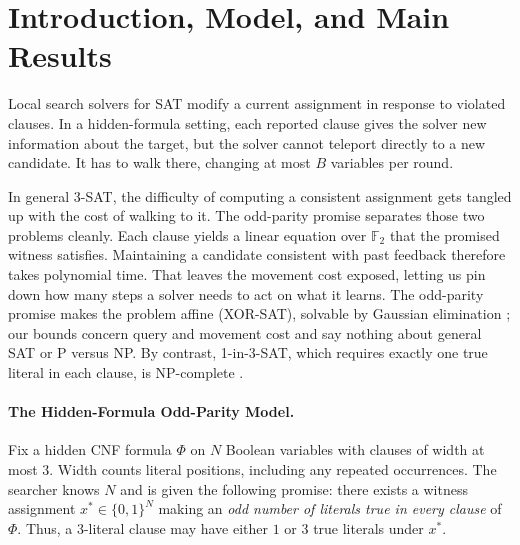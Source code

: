 \documentclass[11pt,a4paper]{article}
\theoremstyle{definition}
\theoremstyle{remark}
\newcommand{\F}{\mathbb{F}}
\begin{document}
\section{Introduction, Model, and Main Results}

Local search solvers for SAT modify a current assignment in response to violated clauses. In a hidden-formula setting, each reported clause gives the solver new information about the target, but the solver cannot teleport directly to a new candidate. It has to walk there, changing at most $B$ variables per round.

In general 3-SAT, the difficulty of computing a consistent assignment gets tangled up with the cost of walking to it. The odd-parity promise separates those two problems cleanly. Each clause yields a linear equation over $\F_2$ that the promised witness satisfies. Maintaining a candidate consistent with past feedback therefore takes polynomial time. That leaves the movement cost exposed, letting us pin down how many steps a solver needs to act on what it learns. The odd-parity promise makes the problem affine (XOR-SAT), solvable by Gaussian elimination \cite{schaefer1978}; our bounds concern query and movement cost and say nothing about general SAT or P versus NP. By contrast, 1-in-3-SAT, which requires exactly one true literal in each clause, is NP-complete \cite{schaefer1978}.

\paragraph{The Hidden-Formula Odd-Parity Model.}
Fix a hidden CNF formula $\Phi$ on $N$ Boolean variables with clauses of width at most $3$. Width counts literal positions, including any repeated occurrences. The searcher knows $N$ and is given the following promise: there exists a witness assignment $x^* \in \{0,1\}^N$ making an \emph{odd number of literals true in every clause} of $\Phi$. Thus, a $3$-literal clause may have either $1$ or $3$ true literals under $x^*$.
\end{document}
